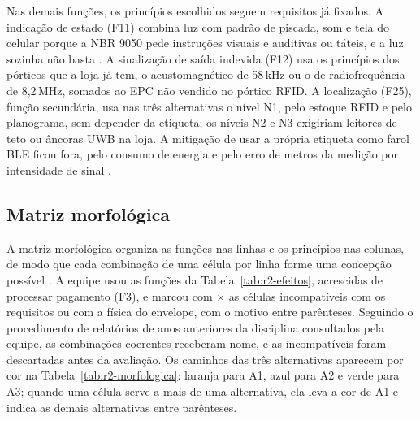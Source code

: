 Nas demais funções, os princípios escolhidos seguem requisitos já fixados. A indicação de estado (F11) combina luz com padrão de piscada, som e tela do celular porque a NBR 9050 pede instruções visuais e auditivas ou táteis, e a luz sozinha não basta \cite{abnt2020nbr9050}. A sinalização de saída indevida (F12) usa os princípios dos pórticos que a loja já tem, o acustomagnético de 58\,kHz ou o de radiofrequência de 8,2\,MHz, somados ao EPC não vendido no pórtico RFID. A localização (F25), função secundária, usa nas três alternativas o nível N1, pelo estoque RFID e pelo planograma, sem depender da etiqueta; os níveis N2 e N3 exigiriam leitores de teto ou âncoras UWB na loja. A mitigação de usar a própria etiqueta como farol BLE ficou fora, pelo consumo de energia e pelo erro de metros da medição por intensidade de sinal \cite{ramirez2021ble}.

\subsection{Matriz morfológica}

A matriz morfológica organiza as funções nas linhas e os princípios nas colunas, de modo que cada combinação de uma célula por linha forme uma concepção possível \cite{rozenfeld2006gestao}. A equipe usou as funções da Tabela~\ref{tab:r2-efeitos}, acrescidas de processar pagamento (F3), e marcou com $\times$ as células incompatíveis com os requisitos ou com a física do envelope, com o motivo entre parênteses. Seguindo o procedimento de relatórios de anos anteriores da disciplina consultados pela equipe, as combinações coerentes receberam nome, e as incompatíveis foram descartadas antes da avaliação. Os caminhos das três alternativas aparecem por cor na Tabela~\ref{tab:r2-morfologica}: laranja para A1, azul para A2 e verde para A3; quando uma célula serve a mais de uma alternativa, ela leva a cor de A1 e indica as demais alternativas entre parênteses.

